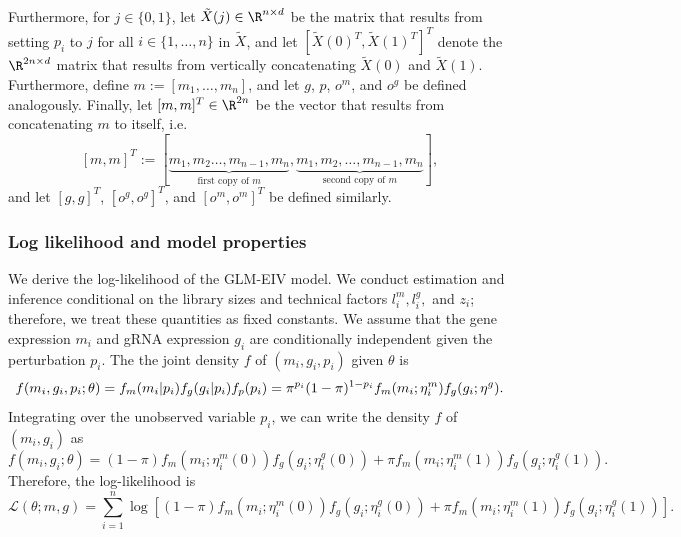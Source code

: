 \documentclass[11pt]{article}
\begin{document}
Furthermore, for $j \in \{0,1\}$, let $\tilde{X}(j) \in \R^{n \times d}$ be the matrix that results from setting $p_i$ to $j$ for all $i \in \{1, \dots, n\}$ in $\tilde{X}$, and let  $[\tilde{X}(0)^T, \tilde{X}(1)^T]^T$ denote the $\R^{2n \times d}$ matrix that results from vertically concatenating $\tilde{X}(0)$ and $\tilde{X}(1)$. Furthermore, define $m := [m_1, \dots, m_n]$, and let $g$, $p$, $o^m$, and $o^g$ be defined analogously. Finally, let $[m,m]^T \in \R^{2n}$ be the vector that results from concatenating $m$ to itself, i.e.
$$ [m,m]^T := [\underbrace{m_1, m_2 \dots, m_{n-1}, m_n}_\textrm{first copy of $m$}, \underbrace{m_1, m_2, \dots, m_{n-1}, m_n}_\textrm{second copy of $m$}],$$ and let $[g,g]^T$, $[o^g,o^g]^T$, and $[o^m,o^m]^T$ be defined similarly. 

\subsubsection*{Log likelihood and model properties}
We derive the log-likelihood of the GLM-EIV model. We conduct estimation and inference conditional on the library sizes and technical factors $l^m_i, l^g_i,$ and $z_i$; therefore, we treat these quantities as fixed constants. We assume that the gene expression $m_i$ and gRNA expression $g_i$ are conditionally independent given the perturbation $p_i$. The the joint density $f$ of $(m_i, g_i, p_i)$ given $\theta$ is $ $
\begin{equation}\label{full_density}
f(m_i,g_i,p_i; \theta) = f_m(m_i | p_i) f_g(g_i | p_i) f_p(p_i) \\ = \pi^{p_i}(1-\pi)^{1-p_i} f_m(m_i; \eta^m_i) f_g(g_i; \eta^g).
\end{equation}
Integrating over the unobserved variable $p_i$, we can write the density $f$ of $(m_i, g_i)$ as
\begin{equation}\label{marginal_density}
f(m_i, g_i; \theta) = (1-\pi) f_m(m_i; \eta^m_i(0)) f_g(g_i; \eta^g_i(0)) + \pi f_m(m_i; \eta^m_i(1)) f_g(g_i; \eta^g_i(1)).
\end{equation}
Therefore, the log-likelihood is
\begin{equation}\label{marginal_log_lik}
\mathcal{L}(\theta; m, g) = \sum_{i=1}^n \log\left[(1-\pi) f_m(m_i; \eta^m_i(0)) f_g(g_i; \eta^g_i(0)) + \pi f_m(m_i; \eta^m_i(1)) f_g(g_i; \eta^g_i(1)) \right].
\end{equation}
\end{document}
